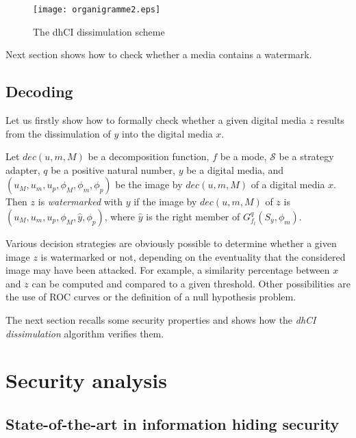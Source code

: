 \documentclass{comjnl}
\begin{document}
\begin{figure}[ht]
\centering
\texttt{[image: organigramme2.eps]}
\caption{The dhCI dissimulation scheme}
\label{fig:organigramme}
\end{figure}


Next section shows how to check whether a media contains a watermark.


\subsection{Decoding}\label{sub:wmdecoding}

Let us firstly show how to formally check whether a given digital media $z$ 
results from the dissimulation of $y$ into the digital media $x$. 



\begin{definition}
Let $\textit{dec}(u,m,M)$ be a decomposition function,
$f$ be a mode, 
$\mathcal{S}$ be a strategy adapter, 
$q$ be a positive natural number,  
$y$ be a digital media, and 
$(u_M,u_m,u_p,\phi_{M},\phi_{m},\phi_{p})$ be the 
image by $\textit{dec}(u,m,M)$  of  a digital media $x$. 
Then $z$ is \emph{watermarked} with $y$ if
the image by $\textit{dec}(u,m,M)$ of $z$ is 
$(u_M,u_m,u_p,\phi_{M},\hat{y},\phi_{p})$, where 
$\hat{y}$ is the right member of $G_{f_l}^q(S_y,\phi_{m})$.
\end{definition}


Various decision strategies are obviously  possible to determine whether a given
image $z$ is watermarked or not, depending  on the eventuality
that the considered image may have  been attacked.
For example, a  similarity percentage between $x$
and  $z$ can  be  computed and compared  to a  given
threshold. Other  possibilities are the use of  ROC curves or
the definition of a null hypothesis problem.











The next section recalls some security properties and shows how the 
\emph{dhCI dissimulation} algorithm verifies them.

\section{Security analysis}\label{sec:security}
\subsection{State-of-the-art in information hiding security}\label{sub:art}
\end{document}
